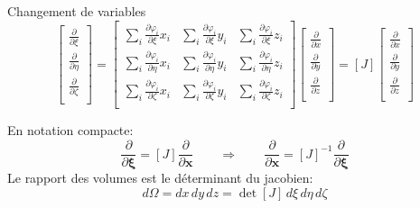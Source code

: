 \documentclass[
mode=present,    %
paper=a4paper,   %
orient=landscape,
display=slides,   %
size=10pt,     %
style=romain   %
]{powerdot}
\begin{document}
\begin{slide}[toc=Chgt de variables]{Changement de variables}
\begin{equation*}
     \begin{bmatrix}
\frac{\partial}{\partial\xi} \\
\frac{\partial}{\partial\eta} \\
\frac{\partial}{\partial\zeta} \\
    \end{bmatrix}
=
     \begin{bmatrix}
\sum_i \frac{\partial \varphi_i}{\partial\xi}x_i & \sum_i \frac{\partial \varphi_i}{\partial\xi}y_i & \sum_i \frac{\partial \varphi_i}{\partial\xi}z_i   \\
\sum_i \frac{\partial \varphi_i}{\partial\eta}x_i & \sum_i \frac{\partial \varphi_i}{\partial\eta}y_i & \sum_i \frac{\partial \varphi_i}{\partial\eta}z_i   \\
\sum_i \frac{\partial \varphi_i}{\partial\zeta}x_i & \sum_i \frac{\partial \varphi_i}{\partial\zeta}y_i & \sum_i \frac{\partial \varphi_i}{\partial\zeta}z_i   \\
    \end{bmatrix}
     \begin{bmatrix}
\frac{\partial}{\partial x} \\
\frac{\partial}{\partial y} \\
\frac{\partial}{\partial z} \\
    \end{bmatrix}
       = [J]
            \begin{bmatrix}
\frac{\partial}{\partial x} \\
\frac{\partial}{\partial y} \\
\frac{\partial}{\partial z} \\
    \end{bmatrix}
\end{equation*}

En notation compacte:
\begin{equation*}
\frac{\partial}{\partial \boldsymbol{\xi}} = [J] \frac{\partial}{\partial \boldsymbol{x}}
\qquad \Rightarrow \qquad
\frac{\partial}{\partial \boldsymbol{x}} = [J]^{-1} \frac{\partial}{\partial \boldsymbol{\xi}}
\end{equation*}
Le rapport des volumes est le déterminant du jacobien:
\begin{equation*}
d\Omega = dx\,dy\,dz = \det [J] \, d\xi\,d\eta\,d\zeta
\end{equation*}

\end{slide}
\end{document}
